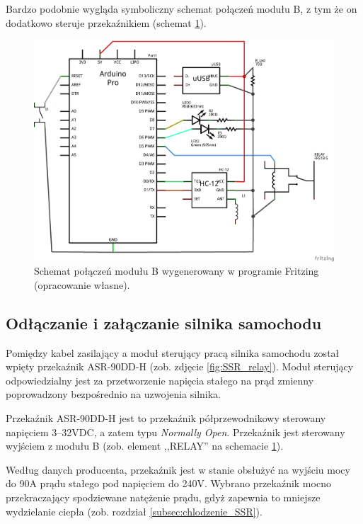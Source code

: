 Bardzo podobnie wygląda symboliczny schemat połączeń modułu B, z tym że on dodatkowo steruje przekaźnikiem (schemat \ref{fig:symbolic_schema_B}).

\begin{figure}[H]
	\centering
	\includegraphics[scale=0.4]{schemas/schema_moduleB_schem.png}
	\caption{\label{fig:symbolic_schema_B}Schemat połączeń modułu B wygenerowany w programie Fritzing \cite{Fritzing} (opracowanie własne).}
\end{figure}

\subsection{Odłączanie i załączanie silnika samochodu}
\label{subsec:odlaczanie_zalaczanie_silnika}

Pomiędzy kabel zasilający a moduł sterujący pracą silnika samochodu został wpięty przekaźnik ASR-90DD-H (zob. zdjęcie \ref{fig:SSR_relay}). Moduł sterujący odpowiedzialny jest za przetworzenie napięcia stałego na prąd zmienny poprowadzony bezpośrednio na uzwojenia silnika.

Przekaźnik ASR-90DD-H jest to przekaźnik półprzewodnikowy sterowany napięciem 3–32VDC, a zatem typu \textit{Normally Open}. Przekaźnik jest sterowany wyjściem z modułu B (zob. element ,,RELAY'' na schemacie \ref{fig:symbolic_schema_B}).

Według danych producenta, przekaźnik jest w stanie obsłużyć na wyjściu mocy do 90A prądu stałego pod napięciem do 240V. Wybrano przekaźnik mocno przekraczający spodziewane natężenie prądu, gdyż zapewnia to mniejsze wydzielanie ciepła (zob. rozdział \ref{subsec:chlodzenie_SSR}).

